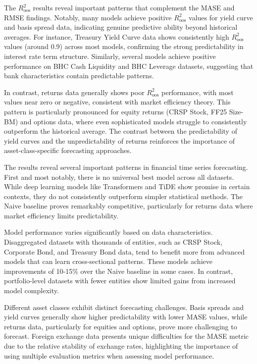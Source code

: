 \documentclass{article}
\begin{document}
The $R^2_{\text{oos}}$ results reveal important patterns that complement the MASE and RMSE findings. Notably, many models achieve positive $R^2_{\text{oos}}$ values for yield curve and basis spread data, indicating genuine predictive ability beyond historical averages. For instance, Treasury Yield Curve data shows consistently high $R^2_{\text{oos}}$ values (around 0.9) across most models, confirming the strong predictability in interest rate term structure. Similarly, several models achieve positive performance on BHC Cash Liquidity and BHC Leverage datasets, suggesting that bank characteristics contain predictable patterns.

In contrast, returns data generally shows poor $R^2_{\text{oos}}$ performance, with most values near zero or negative, consistent with market efficiency theory. This pattern is particularly pronounced for equity returns (CRSP Stock, FF25 Size-BM) and options data, where even sophisticated models struggle to consistently outperform the historical average. The contrast between the predictability of yield curves and the unpredictability of returns reinforces the importance of asset-class-specific forecasting approaches.


The results reveal several important patterns in financial time series forecasting. First and most notably, there is no universal best model across all datasets. While deep learning models like Transformers and TiDE show promise in certain contexts, they do not consistently outperform simpler statistical methods. The Naive baseline proves remarkably competitive, particularly for returns data where market efficiency limits predictability.

Model performance varies significantly based on data characteristics. Disaggregated datasets with thousands of entities, such as CRSP Stock, Corporate Bond, and Treasury Bond data, tend to benefit more from advanced models that can learn cross-sectional patterns. These models achieve improvements of 10-15\% over the Naive baseline in some cases. In contrast, portfolio-level datasets with fewer entities show limited gains from increased model complexity.

Different asset classes exhibit distinct forecasting challenges. Basis spreads and yield curves generally show higher predictability with lower MASE values, while returns data, particularly for equities and options, prove more challenging to forecast. Foreign exchange data presents unique difficulties for the MASE metric due to the relative stability of exchange rates, highlighting the importance of using multiple evaluation metrics when assessing model performance.
\end{document}
